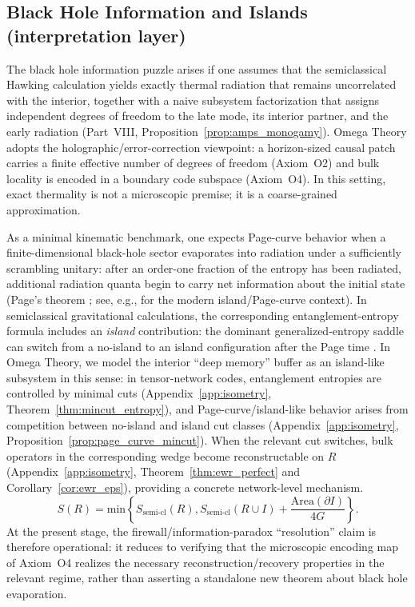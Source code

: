 \subsection{Black Hole Information and Islands (interpretation layer)}
The black hole information puzzle arises if one assumes that the semiclassical Hawking calculation yields exactly thermal radiation that remains uncorrelated with the interior, together with a naive subsystem factorization that assigns independent degrees of freedom to the late mode, its interior partner, and the early radiation (Part~VIII, Proposition~\ref{prop:amps_monogamy}). Omega Theory adopts the holographic/error-correction viewpoint: a horizon-sized causal patch carries a finite effective number of degrees of freedom (Axiom~O2) and bulk locality is encoded in a boundary code subspace (Axiom~O4). In this setting, exact thermality is not a microscopic premise; it is a coarse-grained approximation.
\par
\noindent
As a minimal kinematic benchmark, one expects Page-curve behavior when a finite-dimensional black-hole sector evaporates into radiation under a sufficiently scrambling unitary: after an order-one fraction of the entropy has been radiated, additional radiation quanta begin to carry net information about the initial state (Page's theorem \cite{Page1993}; see, e.g., \cite{Penington2020,Almheiri2019} for the modern island/Page-curve context). In semiclassical gravitational calculations, the corresponding entanglement-entropy formula includes an \emph{island} contribution: the dominant generalized-entropy saddle can switch from a no-island to an island configuration after the Page time \cite{Penington2020,Almheiri2019}. In Omega Theory, we model the interior ``deep memory'' buffer as an island-like subsystem in this sense: in tensor-network codes, entanglement entropies are controlled by minimal cuts (Appendix~\ref{app:isometry}, Theorem~\ref{thm:mincut_entropy}), and Page-curve/island-like behavior arises from competition between no-island and island cut classes (Appendix~\ref{app:isometry}, Proposition~\ref{prop:page_curve_mincut}). When the relevant cut switches, bulk operators in the corresponding wedge become reconstructable on $R$ (Appendix~\ref{app:isometry}, Theorem~\ref{thm:ewr_perfect} and Corollary~\ref{cor:ewr_eps}), providing a concrete network-level mechanism.
\begin{equation}
    S(R) = \text{min} \left\{ S_{\text{semi-cl}}(R), S_{\text{semi-cl}}(R \cup I) + \frac{\text{Area}(\partial I)}{4G} \right\}.
\end{equation}
\noindent
At the present stage, the firewall/information-paradox ``resolution'' claim is therefore operational: it reduces to verifying that the microscopic encoding map of Axiom~O4 realizes the necessary reconstruction/recovery properties in the relevant regime, rather than asserting a standalone new theorem about black hole evaporation.

